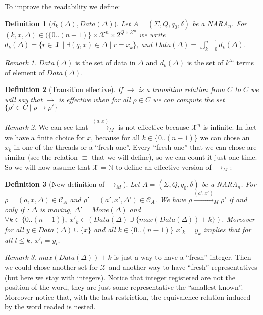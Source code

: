 \documentclass[a4paper,10pt]{report}
\newtheorem{df}{Definition}
\theoremstyle{remark}
\newtheorem{rk}{Remark}
\newcommand{\seg}[1]{\{#1\}}
\newcommand{\ts}{\seg{0 .. (n-1)}}
\newcommand{\C}{\mathcal{C}_{A}}
\newcommand{\Xa}{\mathcal{X}}
\newcommand{\X}{\mathcal{X}^{n}}
\begin{document}
To improve the readability we define:
\begin{df}[$d_k(\Delta),Data(\Delta)$]
  Let $A = (\Sigma ,Q ,q_0, \delta )$ be a \textit{NARA}$_n$.
  For $(k,x,\Delta) \in (\ts \times \X \times 2^{Q\times \X} $ we write $d_k(\Delta) = \{r \in \Xa \mid \exists (q,x) \in \Delta \mid r = x_k\}$, 
  and $Data(\Delta) = \bigcup_{k=0}^{n-1} d_k(\Delta)$.
\end{df}

\begin{rk}
 $Data(\Delta)$ is the set of data in $\Delta$ and 
 $d_k(\Delta)$ is the set of $k^{th}$ terms of element of $Data(\Delta)$. 
\end{rk}

\begin{df}[Transition effective]
  If $\rightarrow$ is a transition relation from $C$ to $C$ we will say that $\rightarrow$ is effective when for all $\rho \in C$ we can compute the set 
  $\{ \rho' \in C \mid \rho \rightarrow \rho'\}$
 
\end{df}


\begin{rk}
  We can see that ${\xrightarrow{(a,x)}}_M$ is not effective because $\X$ is infinite.
  In fact we have a finite choice for $x$, because for all $ k \in \ts$ we can chose an $x_k$ in one of the threads or a ``fresh one''.
  Every ``fresh one'' that we can chose are similar (see the relation $\equiv$ that we will define), so we can count it just one time.
  So we will now assume that $\Xa = \mathbb N$ to define an effective version of ${\xrightarrow{}}_M$:
\end{rk}

\begin{df}[New definition of $\rightarrow_M$]
  \label{minipb}
  Let $A = (\Sigma ,Q ,q_0, \delta )$ be a \textit{NARA}$_n$.
  For $\rho = (a,x,\Delta) \in \C$ and $\rho' = (a',x',\Delta') \in \C$.
  We have $\rho {\xrightarrow{(a',x')}}_M \rho'$ if and only if :
  $\Delta$ is moving, $\Delta' = Move(\Delta)$ and $\forall k \in \ts,\ x'_k \in (Data(\Delta) \cup \{max(Data(\Delta))+k\}) $.
  Moreover for all $y \in Data(\Delta) \cup \{x \}$ and all $k \in \ts$  $x'_k = y_k $ implies that for all $l \leq k $,  $x'_l = y_l $.
\end{df}

\begin{rk}
 $max(Data(\Delta))+k$ is just a way to have a ``fresh'' integer.
 Then we could chose another set for $\Xa$ and another way to have ``fresh'' representatives (but here we stay with integers).
 Notice that integer registered are not the position of the word, they are just some representative the ``smallest known''.
 Moreover notice that, with the last restriction, the equivalence relation induced by the word readed is nested. 
\end{rk}
\end{document}
